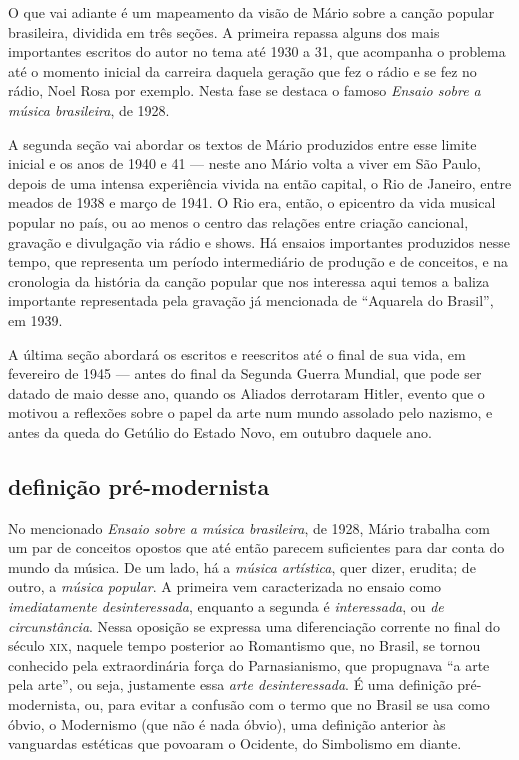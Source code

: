 O que vai adiante é um mapeamento da visão de Mário sobre a canção
popular brasileira, dividida em três seções. A primeira repassa alguns
dos mais importantes escritos do autor no tema até 1930 a 31, que
acompanha o problema até o momento inicial da carreira daquela geração
que fez o rádio e se fez no rádio, Noel Rosa por exemplo. Nesta fase se
destaca o famoso \textit{Ensaio sobre a música brasileira}, de 1928.

A segunda seção vai abordar os textos de Mário produzidos entre esse
limite inicial e os anos de 1940 e 41 --- neste ano Mário volta a viver
em São Paulo, depois de uma intensa experiência vivida na então capital,
o Rio de Janeiro, entre meados de 1938 e março de 1941. O Rio era,
então, o epicentro da vida musical popular no país, ou ao menos o centro
das relações entre criação cancional, gravação e divulgação via rádio e
shows. Há ensaios importantes produzidos nesse tempo, que representa um
período intermediário de produção e de conceitos, e na cronologia da
história da canção popular que nos interessa aqui temos a baliza
importante representada pela gravação já mencionada de ``Aquarela do
Brasil'', em 1939.

A última seção abordará os escritos e reescritos até o final de sua
vida, em fevereiro de 1945 --- antes do final da Segunda Guerra Mundial,
que pode ser datado de maio desse ano, quando os Aliados derrotaram
Hitler, evento que o motivou a reflexões sobre o papel da arte num mundo
assolado pelo nazismo, e antes da queda do Getúlio do Estado Novo, em
outubro daquele ano.

\subsection{definição pré-modernista}

No mencionado \textit{Ensaio sobre a música brasileira}, de 1928, Mário
trabalha com um par de conceitos opostos que até então parecem
suficientes para dar conta do mundo da música. De um lado, há a \textit{música
artística}, quer dizer, erudita; de outro, a \textit{música popular}. A
primeira vem caracterizada no ensaio como \textit{imediatamente
desinteressada}, enquanto a segunda é \textit{interessada}, ou \textit{de
circunstância}. Nessa oposição se expressa uma diferenciação corrente
no final do século \textsc{xix}, naquele tempo posterior ao Romantismo que, no
Brasil, se tornou conhecido pela extraordinária força do Parnasianismo,
que propugnava ``a arte pela arte'', ou seja, justamente essa \textit{arte
desinteressada}. É uma definição pré-modernista, ou, para evitar a
confusão com o termo que no Brasil se usa como óbvio, o Modernismo (que
não é nada óbvio), uma definição anterior às vanguardas estéticas que
povoaram o Ocidente, do Simbolismo em diante.

